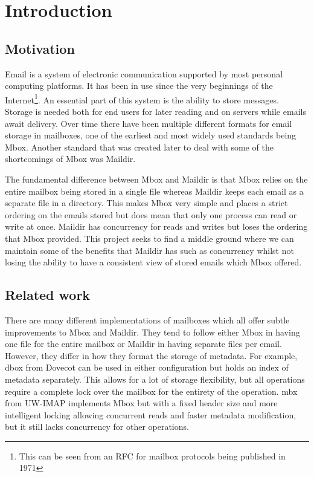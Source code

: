 \chapter{Introduction}

\section{Motivation}

Email is a system of electronic communication supported by most personal computing platforms. It has been in use since the very beginnings of the Internet\footnote{This can be seen from an RFC for mailbox protocols being published in 1971\cite{rfc196}}. An essential part of this system is the ability to store messages. Storage is needed both for end users for later reading and on servers while emails await delivery. Over time there have been multiple different formats for email storage in mailboxes, one of the earliest and most widely used standards being Mbox. Another standard that was created later to deal with some of the shortcomings of Mbox was Maildir.

The fundamental difference between Mbox and Maildir is that Mbox relies on the entire mailbox being stored in a single file whereas Maildir keeps each email as a separate file in a directory. This makes Mbox very simple and places a strict ordering on the emails stored but does mean that only one process can read or write at once. Maildir has concurrency for reads and writes but loses the ordering that Mbox provided. This project seeks to find a middle ground where we can maintain some of the benefits that Maildir has such as concurrency whilst not losing the ability to have a consistent view of stored emails which Mbox offered.

\section{Related work}

There are many different implementations of mailboxes which all offer subtle improvements to Mbox and Maildir. They tend to follow either Mbox in having one file for the entire mailbox or Maildir in having separate files per email. However, they differ in how they format the storage of metadata. For example, dbox from Dovecot can be used in either configuration but holds an index of metadata separately. This allows for a lot of storage flexibility, but all operations require a complete lock over the mailbox for the entirety of the operation. mbx from UW-IMAP implements Mbox but with a fixed header size and more intelligent locking allowing concurrent reads and faster metadata modification, but it still lacks concurrency for other operations.

